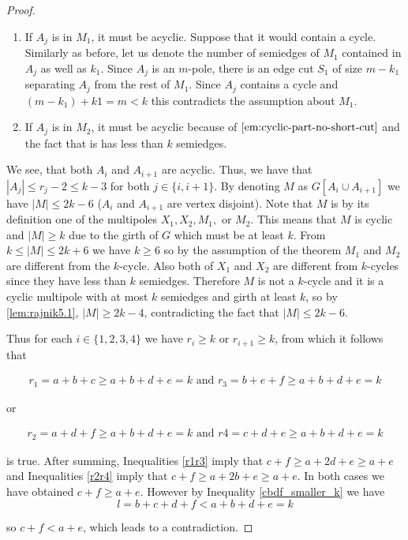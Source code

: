 \documentclass[12pt, twoside]{book}
\begin{document}
\begin{proof}
	\begin{enumerate}
		\item If $A_j$ is in $M_1$, it must be acyclic. Suppose that it would contain a cycle. Similarly as before, let us denote the number of semiedges of $M_1$ contained in $A_j$ as well as $k_1$. Since $A_j$ is an $m$-pole, there is an edge cut $S_1$ of size $m-k_1$ separating $A_j$ from the rest of $M_1$. Since $A_j$ contains a cycle and $(m-k_1)+k1=m<k$ this contradicts the assumption about $M_1$.
		\item If $A_j$ is in $M_2$, it must be acyclic because of $\cref{em:cyclic-part-no-short-cut}$ and the fact that is has less than $k$ semiedges.
	\end{enumerate}
	
	We see, that both $A_i$ and $A_{i+1}$ are acyclic. Thus, we have that $|A_j|\leq r_j-2\leq k-3$ for both $j\in \{i, i+1\}$. By denoting $M$ as $G[A_i\cup A_{i+1}]$ we have $|M|\leq 2k-6$ ($A_i$ and $A_{i+1}$ are vertex disjoint). Note that $M$ is by its definition one of the multipoles $X_1, X_2, M_1,$ or $M_2$. This means that $M$ is cyclic and $|M|\geq k$ due to the girth of $G$ which must be at least $k$. From $k\leq |M|\leq 2k+6$ we have $k\geq 6$ so by the assumption of the theorem $M_1$ and $M_2$ are different from the $k$-cycle. Also both of $X_1$ and $X_2$ are different from $k$-cycles since they have less than $k$ semiedges. Therefore $M$ is not a $k$-cycle and it is a cyclic multipole with at most $k$ semiedges and girth at least $k$, so by \cref{lem:rajnik5.1}, $|M| \geq 2k - 4$, contradicting the fact that $|M|\leq 2k-6$.
	
	Thus for each $i\in\{1,2,3,4\}$ we have $r_i\geq k$ or $r_{i+1}\geq k$, from which it follows that
	
	\begin{align}
		r_1 =a+b+c\geq a+b+d+e=k \text{ and } r_3 =b+e+f \geq a+b+d+e=k\label{r1r3}
	\end{align}
	
	or
	
	\begin{align}
		r_2 =a+d+f \geq a+b+d+e=k \text{ and } r4 =c+d+e\geq a+b+d+e=k\label{r2r4}
	\end{align}
	
	is true. After summing, Inequalities \cref{r1r3} imply that $c+f\geq a+2d+e\geq a+e$ and Inequalities \cref{r2r4} imply that $c+f\geq a+2b+e\geq a+e$. In both cases we have obtained $c+f\geq a+e$. However by Inequality \cref{cbdf_smaller_k} we have 
	$$l=b+c+d+f<a+b+d+e=k$$
	
	so $c+f<a+e$, which leads to a contradiction.
\end{proof}
\end{document}
